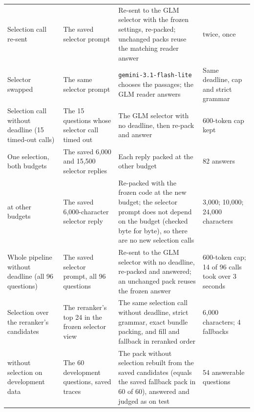 \begin{table}[tp]
\begin{tabularx}{\textwidth}{@{}p{2.6cm}p{2.9cm}Xp{2.8cm}@{}}
Selection call re-sent & The saved selector prompt & Re-sent to the GLM selector with the frozen settings, re-packed; unchanged packs reuse the matching reader answer & \lexb{} twice, \setr{} once \\
Selector swapped & The same selector prompt & \texttt{gemini-3.1-flash-lite} chooses the passages; the GLM reader answers & Same deadline, cap and strict grammar \\
Selection call without deadline (15 timed-out calls) & The 15 questions whose selector call timed out & The GLM selector with no deadline, then re-pack and answer & 600-token cap kept \\
One selection, both budgets & The saved 6,000 and 15,500 selector replies & Each reply packed at the other budget & 82 answers \\
\lexb{} at other budgets & The saved 6,000-character selector reply & Re-packed with the frozen code at the new budget; the selector prompt does not depend on the budget (checked byte for byte), so there are no new selection calls & 3,000; 10,000; 24,000 characters \\
Whole pipeline without deadline (all 96 questions) & The saved selector prompt, all 96 questions & Re-sent to the GLM selector with no deadline, re-packed and answered; an unchanged pack reuses the frozen answer & 600-token cap; 14 of 96 calls took over 3 seconds \\
Selection over the reranker's candidates & The reranker's top 24 in the frozen selector view & The same selection call without deadline, strict grammar, exact bundle packing, and fill and fallback in reranked order & 6,000 characters; 4 fallbacks \\
\lexb{} without selection on development data & The 60 development questions, saved \lexb{} traces & The pack without selection rebuilt from the saved candidates (equals the saved fallback pack in 60 of 60), answered and judged as on test & 54 answerable questions \\
\bottomrule
\end{tabularx}
\end{table}

